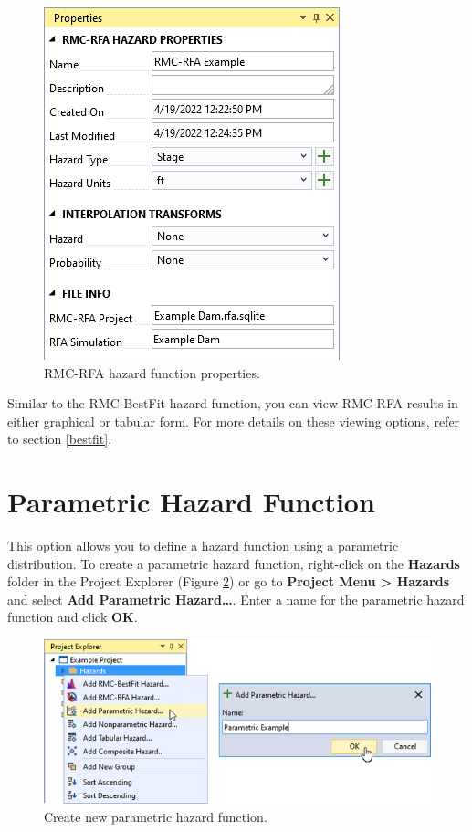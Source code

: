 \documentclass[
]{book}
\begin{document}
\begin{figure}

{\centering \includegraphics{images/figure61} 

}

\caption{RMC-RFA hazard function properties.}\label{fig:figure-61}
\end{figure}

Similar to the RMC-BestFit hazard function, you can view RMC-RFA results in either graphical or tabular form. For more details on these viewing options, refer to section \ref{bestfit}.

\hypertarget{parametric-hazard-function}{%
\section{Parametric Hazard Function}\label{parametric-hazard-function}}

This option allows you to define a hazard function using a parametric distribution. To create a parametric hazard function, right-click on the \textbf{Hazards} folder in the Project Explorer (Figure \ref{fig:figure-62}) or go to \textbf{Project Menu \textgreater{} Hazards} and select \textbf{Add Parametric Hazard\ldots{}}. Enter a name for the parametric hazard function and click \textbf{OK}.

\begin{figure}

{\centering \includegraphics{images/figure62} 

}

\caption{Create new parametric hazard function.}\label{fig:figure-62}
\end{figure}
\end{document}
